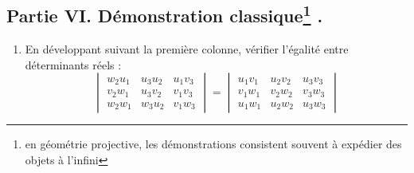 \subsection*{Partie VI. Démonstration classique\footnote{en géométrie projective, les démonstrations consistent souvent à \og expédier des objets à l'infini\fg } .}
\begin{enumerate}
\item En développant suivant la première colonne, vérifier l'égalité entre déterminants réels :
\begin{displaymath}
 \begin{vmatrix}
  w_2u_1 & u_3u_2 & u_1v_3 \\
  v_2w_1 & u_3v_2 & v_1v_3 \\
  w_2w_1 & w_3u_2 & v_1w_3
 \end{vmatrix}
=
\begin{vmatrix}
 u_1v_1 & u_2v_2 & u_3v_3 \\
 v_1w_1 & v_2w_2 & v_3w_3 \\
 u_1w_1 & u_2w_2 & u_3w_3
\end{vmatrix}
\end{displaymath}


\end{enumerate}

